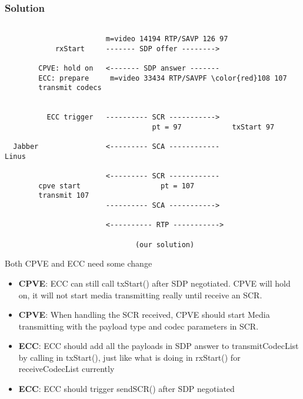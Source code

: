 \documentclass{beamer}
\begin{document}
\begin{frame}[fragile]
  \frametitle{Solution}

\begin{center}
\begin{BVerbatim}[fontfamily=courier, fontsize=\relsize{-4}, commandchars=\\\{\}]

                        m=video 14194 RTP/SAVP 126 97
            rxStart     ------- SDP offer -------->        
                                                  
        CPVE: hold on   <------- SDP answer -------      
        ECC: prepare     m=video 33434 RTP/SAVPF \color{red}108 107
        transmit codecs 
            

          ECC trigger   ---------- SCR ----------->        
                                   pt = 97            txStart 97
    
  Jabber                <--------- SCA ------------                 Linus

                        <--------- SCR ------------        
        cpve start                   pt = 107
        transmit 107
                        ---------- SCA ----------->       

                        <---------- RTP ----------->        
                           
                               (our solution)

\end{BVerbatim}
\end{center}

{
Both CPVE and ECC need some change
\begin{itemize}
  \item \textbf{CPVE}: ECC can still call txStart() after SDP negotiated. CPVE will hold on, it will not start media transmitting really until receive an SCR.
  \item \textbf{CPVE}: When handling the SCR received, CPVE should start Media transmitting with the payload type and codec parameters in SCR.
  \item \textbf{ECC}: ECC should add all the payloads in SDP answer to transmitCodecList by calling  in txStart(), just like what is doing in rxStart() for receiveCodecList currently
  \item \textbf{ECC}: ECC should trigger sendSCR() after SDP negotiated
\end{itemize}
}

\end{frame}
\end{document}
